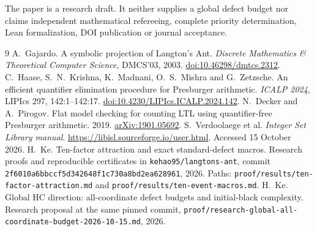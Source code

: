 \documentclass[11pt]{article}
\theoremstyle{remark}\newtheorem{remark}[theorem]{Remark}
\begin{document}
The paper is a research draft. It neither supplies a global defect budget nor
claims independent mathematical refereeing, complete priority determination,
Lean formalization, DOI publication or journal acceptance.

\begingroup\small
\begin{thebibliography}{9}\setlength{\itemsep}{1pt}
 A.~Gajardo. A symbolic projection of Langton's Ant.
\emph{Discrete Mathematics \& Theoretical Computer Science}, DMCS'03, 2003.
\href{https://doi.org/10.46298/dmtcs.2312}{doi:10.46298/dmtcs.2312}.
 C.~Haase, S.~N.~Krishna, K.~Madnani, O.~S.~Mishra and
G.~Zetzsche. An efficient quantifier elimination procedure for Presburger
arithmetic. \emph{ICALP 2024}, LIPIcs 297, 142:1--142:17.
\href{https://doi.org/10.4230/LIPIcs.ICALP.2024.142}{doi:10.4230/LIPIcs.ICALP.2024.142}.
 N.~Decker and A.~Pirogov. Flat model checking for counting LTL
using quantifier-free Presburger arithmetic. 2019.
\href{https://arxiv.org/abs/1901.05692}{arXiv:1901.05692}.
 S.~Verdoolaege et al. \emph{Integer Set Library manual}.
\url{https://libisl.sourceforge.io/user.html}. Accessed 15 October 2026.
 H.~Ke. Ten-factor attraction and exact standard-defect macros.
Research proofs and reproducible certificates in \texttt{kehao95/langtons-ant},
commit \texttt{2f6010a6bbccf5d342648f1c730a8bd2ea628961}, 2026.
Paths: \texttt{proof/results/ten-factor-attraction.md} and
\texttt{proof/results/ten-event-macros.md}.
 H.~Ke. Global HC direction: all-coordinate defect budgets
and initial-black complexity. Research proposal at the same pinned commit,
\texttt{proof/research-global-all-coordinate-budget-2026-10-15.md}, 2026.
\end{thebibliography}
\endgroup
\end{document}
